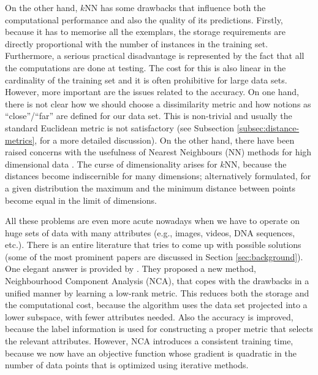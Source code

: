 On the other hand, $k$NN has some drawbacks that influence both the computational performance and also the quality of its predictions. Firstly, because it has to memorise all the exemplars, the storage requirements are directly proportional with the number of instances in the training set. Furthermore, a serious practical disadvantage is represented by the fact that all the computations are done at testing. The cost for this is also linear in the cardinality of the training set and it is often prohibitive for large data sets. However, more important are the issues related to the accuracy. On one hand, there is not clear how we should choose a dissimilarity metric and how notions as ``close''/``far'' are defined for our data set. This is non-trivial and usually the standard Euclidean metric is not satisfactory (see Subsection \ref{subsec:distance-metrics}, for a more detailed discussion). On the other hand, there have been raised concerns with the usefulness of Nearest Neighbours (NN) methods for high dimensional data \citep{beyer1999, hinneburg2000}. The curse of dimensionality arises for $k$NN, because the distances become indiscernible for many dimensions; alternatively formulated, for a given distribution the maximum and the minimum distance between points become equal in the limit of dimensions. 

All these problems are even more acute nowadays when we have to operate on huge sets of data with many attributes (e.g., images, videos, DNA sequences, etc.). There is an entire literature that tries to come up with possible solutions (some of the most prominent papers are discussed in Section \ref{sec:background}). One elegant answer is provided by \citet{goldberger2004}. They proposed a new method, Neighbourhood Component Analysis (NCA), that copes with the drawbacks in a unified manner by learning a low-rank metric. This reduces both the storage and the computational cost, because the algorithm uses the data set projected into a lower subspace, with fewer attributes needed. Also the accuracy is improved, because the label information is used for constructing a proper metric that selects the relevant attributes. However, NCA introduces a consistent training time, because we now have an objective function whose gradient is quadratic in the number of data points that is optimized using iterative methods. 

